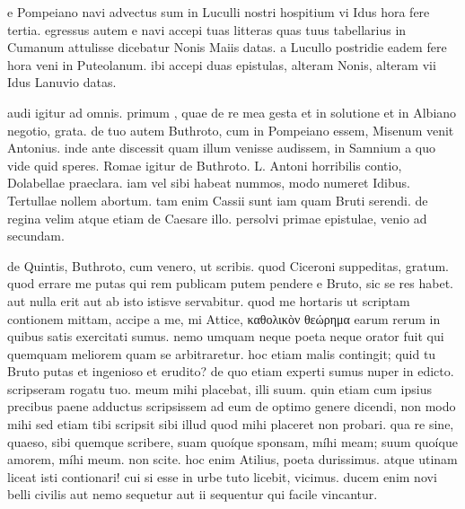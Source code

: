 


 e Pompeiano navi advectus sum in Luculli nostri hospitium vi Idus hora fere tertia. egressus autem e navi accepi tuas litteras quas tuus tabellarius in Cumanum attulisse dicebatur Nonis Maiis datas. a Lucullo postridie eadem fere hora veni in Puteolanum. ibi accepi duas epistulas, alteram Nonis, alteram vii Idus Lanuvio datas.

 audi igitur ad omnis. primum , quae de re mea gesta et in solutione et in Albiano negotio, grata. de tuo autem Buthroto, cum in Pompeiano essem, Misenum venit Antonius. inde ante discessit quam illum venisse audissem, in Samnium a quo vide quid speres. Romae igitur de Buthroto. L. Antoni horribilis contio, Dolabellae praeclara. iam vel sibi habeat nummos, modo numeret Idibus. Tertullae nollem abortum. tam enim Cassii sunt iam quam Bruti serendi. de regina velim atque etiam de Caesare illo. persolvi primae epistulae, venio ad secundam.

 de Quintis, Buthroto, cum venero, ut scribis. quod Ciceroni suppeditas, gratum. quod errare me putas qui rem publicam putem pendere e Bruto, sic se res habet. aut nulla erit aut ab isto istisve servabitur. quod me hortaris ut scriptam contionem mittam, accipe a me, mi Attice, καθολικὸν θεώρημα earum rerum in quibus satis exercitati sumus. nemo umquam neque poeta neque orator fuit qui quemquam meliorem quam se arbitraretur. hoc etiam malis contingit; quid tu Bruto putas et ingenioso et erudito? de quo etiam experti sumus nuper in edicto. scripseram rogatu tuo. meum mihi placebat, illi suum. quin etiam cum ipsius precibus paene adductus scripsissem ad eum de optimo genere dicendi, non modo mihi sed etiam tibi scripsit sibi illud quod mihi placeret non probari. qua re sine, quaeso, sibi quemque scribere, suam quoíque sponsam, míhi meam; suum quoíque amorem, míhi meum. non scite. hoc enim Atilius, poeta durissimus. atque utinam liceat isti contionari! cui si esse in urbe tuto licebit, vicimus. ducem enim novi belli civilis aut nemo sequetur aut ii sequentur qui facile vincantur.

